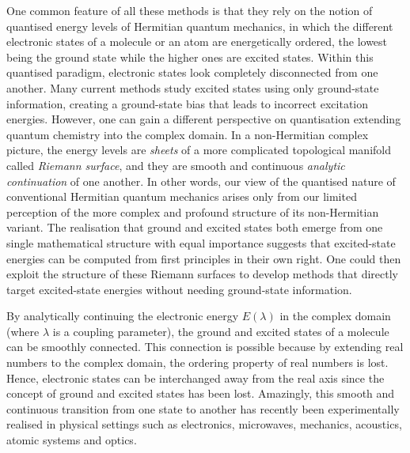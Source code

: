 \documentclass[aps,prb,reprint,noshowkeys,linenumbers,superscriptaddress]{revtex4-1}
\begin{document}
One common feature of all these methods is that they rely on the notion of quantised energy levels of Hermitian quantum mechanics, in which the different electronic states of a molecule or an atom are energetically ordered, the lowest being the ground state while the higher ones are excited states. 
Within this quantised paradigm, electronic states look completely disconnected from one another.
Many current methods study excited states using only ground-state information, creating a ground-state bias that leads to incorrect excitation energies.
However, one can gain a different perspective on quantisation extending quantum chemistry into the complex domain.
In a non-Hermitian complex picture, the energy levels are \textit{sheets} of a more complicated topological manifold called \textit{Riemann surface}, and they are smooth and continuous \textit{analytic continuation} of one another. 
In other words, our view of the quantised nature of conventional Hermitian quantum mechanics arises only from our limited perception of the more complex and profound structure of its non-Hermitian variant. \cite{MoiseyevBook,BenderPTBook}
The realisation that ground and excited states both emerge from one single mathematical structure with equal importance suggests that excited-state energies can be computed from first principles in their own right. 
One could then exploit the structure of these Riemann surfaces to develop methods that directly target excited-state energies without needing ground-state information. \cite{Burton_2019,Burton_2019a}

By analytically continuing the electronic energy $E(\lambda)$ in the complex domain (where $\lambda$ is a coupling parameter), the ground and excited states of a molecule can be smoothly connected.
This connection is possible because by extending real numbers to the complex domain, the ordering property of real numbers is lost.
Hence, electronic states can be interchanged away from the real axis since the concept of ground and excited states has been lost.
Amazingly, this smooth and continuous transition from one state to another has recently been experimentally realised in physical settings such as electronics, microwaves, mechanics, acoustics, atomic systems and optics. \cite{Bittner_2012,Chong_2011,Chtchelkatchev_2012,Doppler_2016,Guo_2009,Hang_2013,Liertzer_2012,Longhi_2010,Peng_2014, Peng_2014a,Regensburger_2012,Ruter_2010,Schindler_2011,Szameit_2011,Zhao_2010,Zheng_2013,Choi_2018,El-Ganainy_2018}
\end{document}
